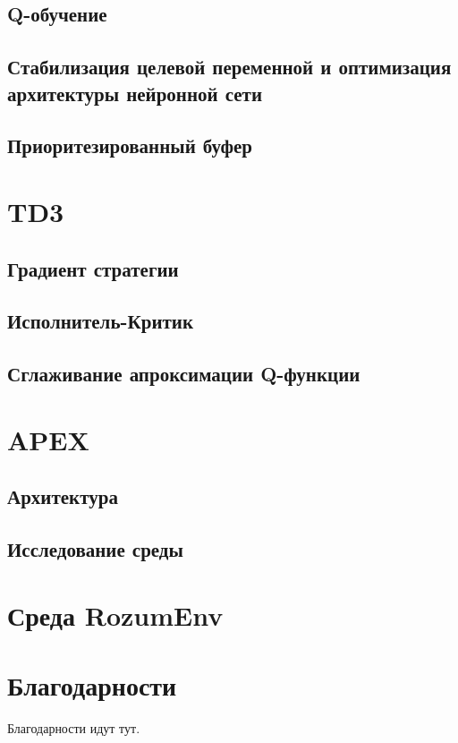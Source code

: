 \documentclass{mipt-thesis-bs}
\begin{document}
\section{Q-обучение}
\section{Стабилизация целевой переменной и оптимизация архитектуры нейронной сети}
\section{Приоритезированный буфер}


\chapter{TD3}
\section{Градиент стратегии}
\section{Исполнитель-Критик}
\section{Сглаживание апроксимации Q-функции}


\chapter{APEX}
\section{Архитектура}
\section{Исследование среды}

\chapter{Среда RozumEnv}


\backmatter


\chapter{Благодарности}

Благодарности идут тут.
\end{document}
